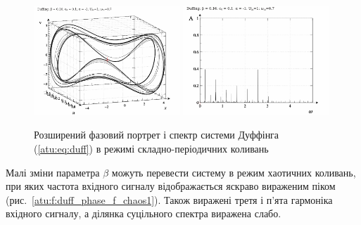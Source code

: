 \begin{figure}[ht!]
\begin{center}
  \includegraphics[width=0.49\textwidth]{p/cha/duff/duff_p_1x00_0x70_0x16.png}
  \hfill
  \includegraphics[width=0.49\textwidth]{p/cha/duff/duff_f_1x00_0x70_0x16.png}
\end{center}
\caption{Розширений фазовий портрет і спектр системи Дуффінга (\ref{atu:eq:duff}) в режимі складно-періодичних коливань}
\label{atu:f:duff_phase_f_reg}
\end{figure}

Малі зміни параметра
$ \beta $ можуть перевести систему в режим хаотичних коливань, при
яких частота вхідного сигналу відображається яскраво вираженим піком
(рис.~\ref{atu:f:duff_phase_f_chaos1}). Також виражені третя і п'ята гармоніка
вхідного сигналу, а ділянка суцільного спектра виражена слабо.

